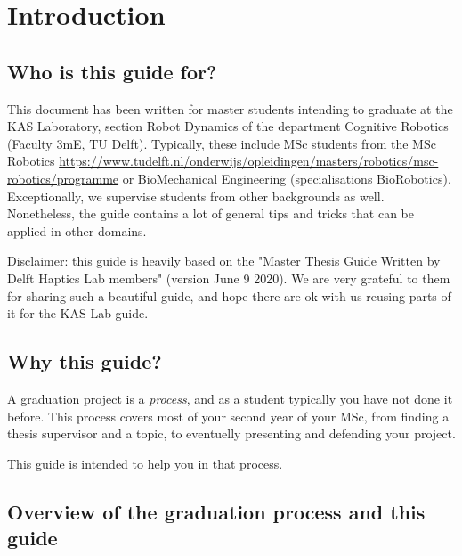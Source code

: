 \chapter{Introduction}\label{c:introduction}

\section{Who is this guide for?}

This document has been written for master students intending to graduate at the KAS Laboratory, section Robot Dynamics of the department Cognitive Robotics (Faculty 3mE, TU Delft). Typically, these include MSc students from the MSc Robotics \url{https://www.tudelft.nl/onderwijs/opleidingen/masters/robotics/msc-robotics/programme} or BioMechanical Engineering (specialisations BioRobotics). Exceptionally, we supervise students from other backgrounds as well. 
Nonetheless, the guide contains a lot of general tips and tricks that can be applied in other domains.

Disclaimer: this guide is heavily based on the "Master Thesis Guide
Written by Delft Haptics Lab members" (version June 9 2020). We are very grateful to them for sharing such a beautiful guide, and hope there are ok with us reusing parts of it for the KAS Lab guide.

\section{Why this guide?}

A graduation project is a \textit{process}, and as a student typically you have not done it before.
This process covers most of your second year of your MSc, from finding a thesis supervisor and a topic, to eventuelly presenting and defending your project.

This guide is intended to help you in that process. 


\section{Overview of the graduation process and this guide}

